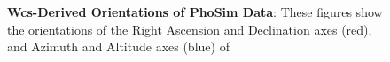 \documentclass[DM,toc]{lsstdoc}
\begin{document}
\begin{figure}
    \centering
    \qquad
     \\
    \qquad
     \\
    \caption{{\bf Wcs-Derived Orientations of PhoSim Data}: These
      figures show the orientations of the Right Ascension and
      Declination axes (red), and Azimuth and Altitude axes (blue) of
}
\end{figure}
\end{document}
